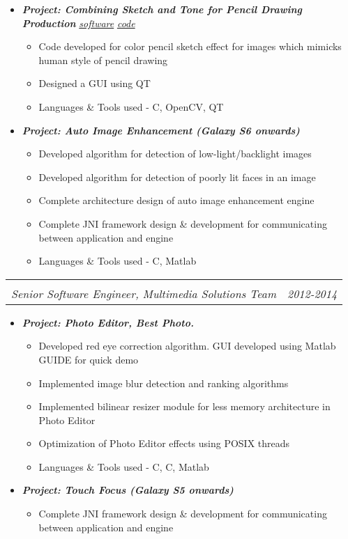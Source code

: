 \documentclass[letterpaper,11pt]{article}
\makeatletter
\def\CC{{C\nolinebreak[4]\hspace{-.05em}\raisebox{.4ex}{\tiny\bf ++}}}
\newcommand{\resitem}[1]{\item #1 \vspace{-2pt}}
\newcommand{\ressubheading}[4]{
	\begin{tabular*}{7.0in}{l@{\extracolsep{\fill}}r}
		\textbf{#1} & #2 \\
		\textit{#3} & \textit{#4} \\
	\end{tabular*}\vspace{-6pt}}
\makeatother
\begin{document}
\begin{itemize}
\begin{itemize}
				\vspace{1mm}
				\resitem[]{\faCircleO \hspace{1mm}\textbf{\emph{Project: Combining Sketch and Tone for Pencil Drawing Production}} 
					\faWindows \hspace{1mm} \href{https://github.com/nrupatunga/Pencil-Sketch/releases/tag/v1.0-beta}{\emph{software}}
					\faGithub \hspace{1mm} \href{https://github.com/nrupatunga/Color-Pencil-Sketch}{\emph{code}}}
				\begin{itemize}
						\resitem{Code developed for color pencil sketch effect for images which mimicks human style of pencil drawing}
						\resitem{Designed a GUI using QT}
						\resitem{Languages \& Tools used - \CC, OpenCV, QT}
				\end{itemize}
				\vspace{3mm}
				\resitem[]{\faCircleO \hspace{1mm}\textbf{\emph{Project: Auto Image Enhancement (Galaxy S6 onwards)}}}
				\begin{itemize}
						\resitem{Developed algorithm for detection of low-light/backlight images}
						\resitem{Developed algorithm for detection of poorly lit faces in an image}
						\resitem{Complete architecture design of auto image enhancement engine }
						\resitem{Complete JNI framework design \& development for communicating between application and engine}
						\resitem{Languages \& Tools used - C, Matlab}
				\end{itemize}
		\end{itemize}
		\ressubheading{}{}{Senior Software Engineer, Multimedia Solutions Team}{2012-2014}
		\begin{itemize}
				\resitem[]{\faCircleO \hspace{1mm}\textbf{\emph{Project: Photo Editor, Best Photo.}}}
				\begin{itemize}
						\resitem{Developed red eye correction algorithm. GUI developed using Matlab GUIDE for quick demo }
						\resitem{Implemented image blur detection and ranking algorithms}
						\resitem{Implemented bilinear resizer module for less memory architecture in Photo Editor}
						\resitem{Optimization of Photo Editor effects using POSIX threads}
						\resitem{Languages \& Tools used - C, \CC, Matlab}
				\end{itemize}
				\vspace{1mm}
				\resitem[]{\faCircleO \hspace{1mm}\textbf{\emph{Project: Touch Focus (Galaxy S5 onwards)}}}
				\begin{itemize}
						\resitem{Complete JNI framework design \& development for communicating between application and engine}
				\end{itemize}
		\end{itemize}

\end{itemize}
\end{document}
